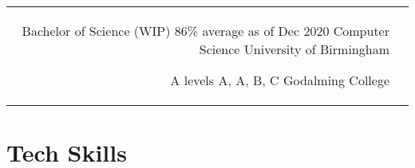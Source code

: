 \documentclass[11pt]{article} %
\begin{document}
\begin{paracol}{2}




\begin{supertabular}{rl} %

	
	{Bachelor of Science (WIP)} %
	{86\% average as of Dec 2020} %
	{Computer Science} %
	{University of Birmingham} %
	
	
	{A levels} %
	{A, A, B, C} %
	{} %
	{Godalming College} %
	

\end{supertabular}


\section{Tech Skills} 





 \\
 \\
 \\



\end{paracol}
\end{document}
